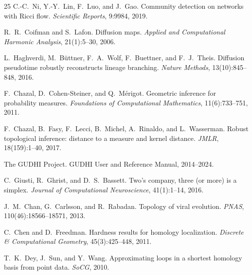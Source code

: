 \documentclass[11pt]{article}
\begin{document}
\begin{thebibliography}{25}
C.-C.~Ni, Y.-Y.~Lin, F.~Luo, and J.~Gao.
Community detection on networks with Ricci flow.
\emph{Scientific Reports}, 9:9984, 2019.

R.~R.~Coifman and S.~Lafon.
Diffusion maps.
\emph{Applied and Computational Harmonic Analysis}, 21(1):5--30, 2006.

L.~Haghverdi, M.~Büttner, F.~A.~Wolf, F.~Buettner, and F.~J.~Theis.
Diffusion pseudotime robustly reconstructs lineage branching.
\emph{Nature Methods}, 13(10):845--848, 2016.

F.~Chazal, D.~Cohen-Steiner, and Q.~M\'erigot.
Geometric inference for probability measures.
\emph{Foundations of Computational Mathematics}, 11(6):733--751, 2011.

F.~Chazal, B.~Fasy, F.~Lecci, B.~Michel, A.~Rinaldo, and L.~Wasserman.
Robust topological inference: distance to a measure and kernel distance.
\emph{JMLR}, 18(159):1--40, 2017.

The GUDHI Project.
GUDHI User and Reference Manual, 2014--2024.

C.~Giusti, R.~Ghrist, and D.~S.~Bassett.
Two's company, three (or more) is a simplex.
\emph{Journal of Computational Neuroscience}, 41(1):1--14, 2016.

J.~M.~Chan, G.~Carlsson, and R.~Rabadan.
Topology of viral evolution.
\emph{PNAS}, 110(46):18566--18571, 2013.

C.~Chen and D.~Freedman.
Hardness results for homology localization.
\emph{Discrete \& Computational Geometry}, 45(3):425--448, 2011.

T.~K.~Dey, J.~Sun, and Y.~Wang.
Approximating loops in a shortest homology basis from point data.
\emph{SoCG}, 2010.

\end{thebibliography}
\end{document}
